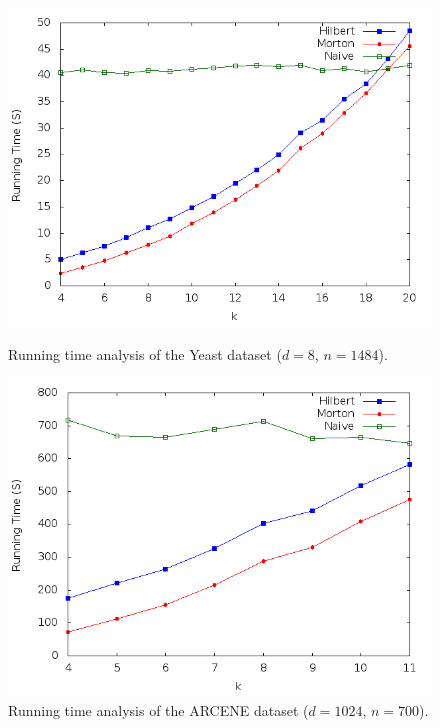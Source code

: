 \documentclass[10pt]{article}
\begin{document}
\begin{figure}
\begin{center}
\includegraphics[scale=0.5]{YeaGra.png}
\caption{Running time analysis of the Yeast dataset ($d = 8$, $n = 1484$).}
\label{run-yeast}
\par\vspace{\intextsep}
\includegraphics[scale=0.5]{ArcGra.png}
\caption{Running time analysis of the ARCENE dataset ($d = 1024$, $n = 700$).}
\label{run-arcene}
\end{center}
\end{figure}
\end{document}
